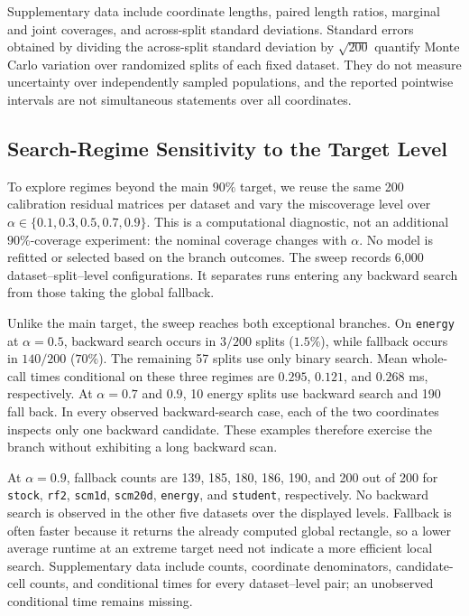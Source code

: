 Supplementary data include coordinate lengths, paired length ratios,
marginal and joint coverages, and across-split standard deviations.
Standard errors obtained by dividing
the across-split standard deviation by $\sqrt{200}$ quantify Monte Carlo
variation over randomized splits of each fixed dataset. They do not measure
uncertainty over independently sampled populations, and the reported
pointwise intervals are not simultaneous statements over all coordinates.

\FloatBarrier
\subsection{Search-Regime Sensitivity to the Target Level}
\label{app:real-search-stress}

To explore regimes beyond the main $90\%$ target, we reuse the same 200
calibration residual matrices per dataset and vary the miscoverage level over
$\alpha\in\{0.1,0.3,0.5,0.7,0.9\}$. This is a computational diagnostic,
not an additional $90\%$-coverage experiment: the nominal coverage changes
with $\alpha$. No model is refitted or selected based on the branch outcomes.
The sweep records 6,000 dataset--split--level configurations. It separates
runs entering any backward search from those taking the global fallback.

Unlike the main target, the sweep reaches both exceptional branches.
On \texttt{energy} at $\alpha=0.5$, backward search occurs in $3/200$
splits ($1.5\%$), while fallback occurs in $140/200$ ($70\%$). The
remaining 57 splits use only binary search. Mean whole-call times
conditional on these three regimes are $0.295$, $0.121$, and $0.268$ ms,
respectively. At $\alpha=0.7$ and $0.9$, 10 energy splits use backward
search and 190 fall back. In every observed backward-search case, each of
the two coordinates inspects only one backward candidate. These examples
therefore exercise the branch without exhibiting a long backward scan.

At $\alpha=0.9$, fallback counts are 139, 185, 180, 186, 190, and 200 out
of 200 for \texttt{stock}, \texttt{rf2}, \texttt{scm1d}, \texttt{scm20d},
\texttt{energy}, and \texttt{student}, respectively. No backward search
is observed in the other five datasets over the displayed levels.
Fallback is often faster because it returns the already computed global
rectangle, so a lower average runtime at an extreme target need not
indicate a more efficient local search. Supplementary data include counts,
coordinate denominators, candidate-cell counts, and conditional times for
every dataset--level pair; an unobserved conditional time remains missing.

